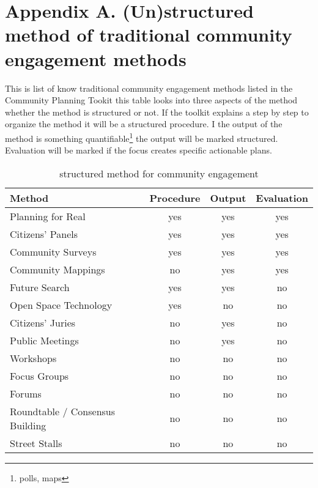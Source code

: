 \chapter{Appendix A. (Un)structured method of traditional community engagement methods}
\label{app:traditional}

This is list of know traditional community engagement methods listed in the Community Planning Tookit \cite{communityToolkit} this table looks into three aspects of the method whether the method is structured or not. If the toolkit explains a step by step to organize the method it will be a structured procedure. I the output of the method is something quantifiable\footnote{polls, maps} the output will be marked structured. Evaluation will be marked if the focus creates specific actionable plans.

\begin{table}
\centering
\begin{tabular}{|m{10em}|c|c|c|}
Method & Procedure & Output & Evaluation \\
\toprule
Planning for Real & yes & yes & yes \\
Citizens' Panels & yes & yes & yes \\ 
Community Surveys & yes & yes & yes \\
Community Mappings & no & yes & yes \\
Future Search & yes & yes & no \\
Open Space Technology & yes & no & no \\
Citizens' Juries & no & yes & no \\
Public Meetings & no & yes & no \\
Workshops & no & no & no \\
Focus Groups & no & no & no \\
Forums & no & no & no \\
Roundtable / Consensus Building & no & no & no \\
Street Stalls & no & no & no \\
\end{tabular}
\caption{structured method for community engagement}
\label{tab:traditional_method}
\end{table}
